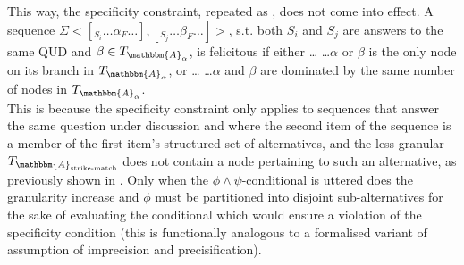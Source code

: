 \noindent This way, the specificity constraint, repeated as , does not come into effect.
\pex
{}
A sequence $\Sigma<[_{S_i}\ldots\alpha_F\ldots],[_{S_j}\ldots\beta_F\ldots]>$, s.t. both
$S_i$ and $S_j$ are answers to the same QUD and $\beta\in T_{\mathbbm{A}_\alpha}$, is felicitous if either \dots
\a \dots $\alpha$ or $\beta$ is the only node on its branch in $T_{\mathbbm{A}_\alpha}$, or \dots {}
\a \dots $\alpha$ and $\beta$ are dominated by the same number of nodes in $T_{\mathbbm{A}_\alpha}$.\\\emptyfill\parencite[p.~643]{Ippolito2020}
\xe
This is because the specificity constraint only applies to sequences that answer the same question under discussion and where the second item of the sequence is a member of the first item's structured set of alternatives, and the less granular $T_{\mathbbm{A}_\text{strike-match}}$ does not contain a node pertaining to such an alternative, as previously shown in . Only when the $\phi\land\psi$-conditional is uttered does the granularity increase and $\phi$ must be partitioned into disjoint sub-alternatives for the sake of evaluating the conditional which would ensure a violation of the specificity condition (this is functionally analogous to a formalised variant of  assumption of imprecision and precisification).

